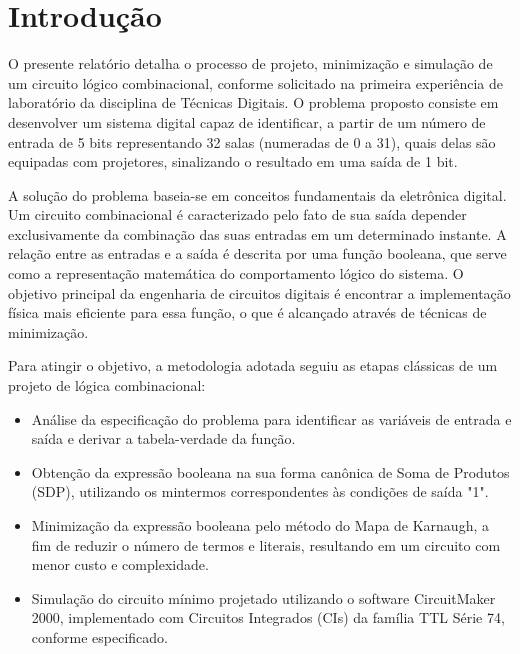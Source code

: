 \documentclass[a4paper, 12pt]{article}
\begin{document}

\newpage


\newpage

\listoffigures
\thispagestyle{empty}

\newpage

\newpage

\thispagestyle{empty}

\newpage

\section{Introdução}

O presente relatório detalha o processo de projeto, minimização e simulação de um circuito lógico combinacional, conforme solicitado na primeira experiência de laboratório da disciplina de Técnicas Digitais. O problema proposto consiste em desenvolver um sistema digital capaz de identificar, a partir de um número de entrada de 5 bits representando 32 salas (numeradas de 0 a 31), quais delas são equipadas com projetores, sinalizando o resultado em uma saída de 1 bit.

A solução do problema baseia-se em conceitos fundamentais da eletrônica digital. Um circuito combinacional é caracterizado pelo fato de sua saída depender exclusivamente da combinação das suas entradas em um determinado instante. A relação entre as entradas e a saída é descrita por uma função booleana, que serve como a representação matemática do comportamento lógico do sistema. O objetivo principal da engenharia de circuitos digitais é encontrar a implementação física mais eficiente para essa função, o que é alcançado através de técnicas de minimização.

Para atingir o objetivo, a metodologia adotada seguiu as etapas clássicas de um projeto de lógica combinacional:
\begin{itemize}
    \item Análise da especificação do problema para identificar as variáveis de entrada e saída e derivar a tabela-verdade da função.
    \item Obtenção da expressão booleana na sua forma canônica de Soma de Produtos (SDP), utilizando os mintermos correspondentes às condições de saída "1".
    \item Minimização da expressão booleana pelo método do Mapa de Karnaugh, a fim de reduzir o número de termos e literais, resultando em um circuito com menor custo e complexidade.
    \item Simulação do circuito mínimo projetado utilizando o software CircuitMaker 2000, implementado com Circuitos Integrados (CIs) da família TTL Série 74, conforme especificado.
\end{itemize}
\end{document}
